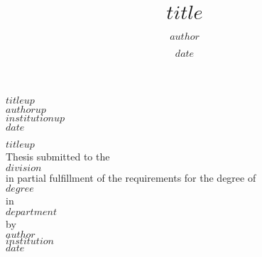 \documentclass[12pt,oneside,a4paper]{reedthesis}
\title{$title$}
\author{$author$}
\date{$date$}
\begin{document}

\pagestyle{empty}
\begin{coverpage}
  \centering
  \vspace*{\fill}
  $titleup$\\
  \vspace{7.5cm}
  $authorup$\\
  \vspace{7.5cm}
  $institutionup$\\
  $date$
  \vspace*{\fill}
\end{coverpage}



\newpage
\begin{titlepag2}
  \centering
  \vspace*{\fill}
  $titleup$\\
  \vspace{2.6cm}
  Thesis submitted to the\\
  $division$\\
  in partial fulfillment of the requirements for the degree of\\
  \vspace{2cm}
  $degree$\\
  in\\
  $department$\\
  \vspace{1.9cm}
  by\\
  $author$\\
  \vspace{3.8cm}
  $institution$\\
  $date$
  \vspace*{\fill}
\end{titlepag2}

\setcounter{page}{1}
\renewcommand{\thepage}{\roman{page}}%





\pagestyle{plain} %
\end{document}
